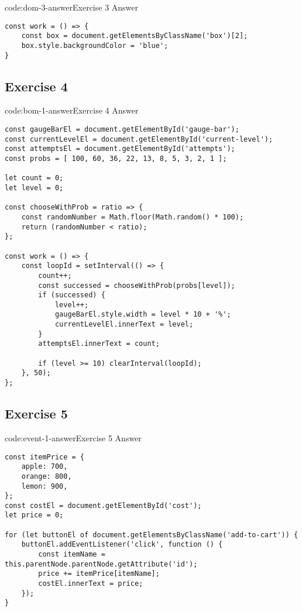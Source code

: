 \begin{codeenv}{code:dom-3-answer}{Exercise 3 Answer}\begin{verbatim}
const work = () => {
    const box = document.getElementsByClassName('box')[2];
    box.style.backgroundColor = 'blue';
}
\end{verbatim}
\end{codeenv}
\newpage

\subsection*{Exercise 4}

\begin{codeenv}{code:bom-1-answer}{Exercise 4 Answer}\begin{verbatim}
const gaugeBarEl = document.getElementById('gauge-bar');
const currentLevelEl = document.getElementById('current-level');
const attemptsEl = document.getElementById('attempts');
const probs = [ 100, 60, 36, 22, 13, 8, 5, 3, 2, 1 ];

let count = 0;
let level = 0;

const chooseWithProb = ratio => {
    const randomNumber = Math.floor(Math.random() * 100);
    return (randomNumber < ratio);
};

const work = () => {
    const loopId = setInterval(() => {
        count++;
        const successed = chooseWithProb(probs[level]);
        if (successed) {
            level++;
            gaugeBarEl.style.width = level * 10 + '%';
            currentLevelEl.innerText = level;
        }
        attemptsEl.innerText = count;

        if (level >= 10) clearInterval(loopId);
    }, 50);
};
\end{verbatim}
\end{codeenv}

\subsection*{Exercise 5}

\begin{codeenv}{code:event-1-answer}{Exercise 5 Answer}\begin{verbatim}
const itemPrice = {
    apple: 700, 
    orange: 800, 
    lemon: 900, 
};
const costEl = document.getElementById('cost');
let price = 0;

for (let buttonEl of document.getElementsByClassName('add-to-cart')) {
    buttonEl.addEventListener('click', function () {
        const itemName = this.parentNode.parentNode.getAttribute('id');
        price += itemPrice[itemName];
        costEl.innerText = price;
    });
}
\end{verbatim}
\end{codeenv}
\newpage

